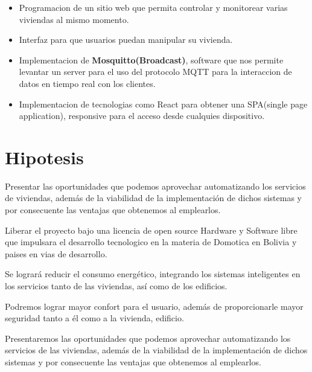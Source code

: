 \documentclass[letterpaper,12pt]{article}
\begin{document}
{\begin{itemize}
			\item Programacion de un sitio web que permita controlar y monitorear varias viviendas al mismo momento. 
			
			\item Interfaz para que usuarios puedan manipular su vivienda.
			
			\item Implementacion de \textbf{Mosquitto(Broadcast)}, software que nos permite levantar un server para el uso del protocolo MQTT para la interaccion de datos en tiempo real con los clientes.
			
			\item Implementacion de tecnologias como React para obtener una SPA(single page application), responsive para el acceso desde cualquies dispositivo.
			
			
		\end{itemize}
		
		
		
		
		\section{Hipotesis}
		
		Presentar las oportunidades que podemos aprovechar automatizando los servicios de viviendas, además de la viabilidad de la implementación de dichos sistemas y por consecuente las ventajas que obtenemos al emplearlos.
		
		Liberar el proyecto bajo una licencia de open source Hardware y Software libre que impulsara el desarrollo tecnologico en la materia de Domotica en Bolivia y paises en vias de desarrollo.
		
		Se logrará reducir el consumo energético, integrando los sistemas inteligentes en los servicios tanto de las viviendas, así como de los edificios.
		
		Podremos lograr mayor confort para el usuario, además de proporcionarle mayor seguridad tanto a él como a la vivienda, edificio.
		
		Presentaremos las oportunidades que podemos aprovechar automatizando los servicios de las viviendas, además de la viabilidad de la implementación de dichos sistemas y por consecuente las ventajas que obtenemos al emplearlos.
		
}
\end{document}
